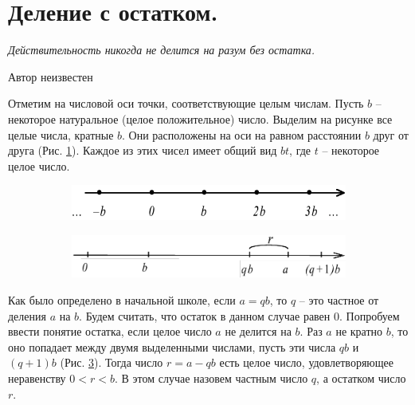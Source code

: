 
\section{Деление с остатком.}

\epigraph{
\textit{Действительность никогда не делится на разум без остатка.
}}{Автор неизвестен}

Отметим на числовой оси точки, соответствующие целым числам. Пусть $b$ – некоторое натуральное (целое положительное) число. Выделим на рисунке все целые числа, кратные $b$. Они расположены на оси на равном расстоянии $b$ друг от друга (Рис. \ref{axis1}). Каждое из этих чисел имеет общий вид $bt$, где $t$ – некоторое целое число. 

\begin{figure}[h]
\begin{subfigure}{.5\textwidth}
  \centering
\includegraphics[width=.8\linewidth]{./img/axis1}
  \caption{}
  \label{axis1}
\end{subfigure}%
\begin{subfigure}{.5\textwidth}
  \centering
\includegraphics[width=.8\linewidth]{./img/axis2}
  \caption{}
  \label{axis2}
\end{subfigure}
  \caption{}
\end{figure}

Как было определено в начальной школе, если $a = qb$, то $q$ – это частное от деления $a$ на $b$. Будем считать, что остаток в данном случае равен $0$. Попробуем ввести понятие остатка, если целое число $a$ не делится на $b$. Раз $a$ не кратно $b$, то оно попадает между двумя выделенными числами, пусть эти числа $qb$ и $(q+1)b$ (Рис. \ref{axis2}). Тогда число $r = a - qb$ есть целое число, удовлетворяющее неравенству $0 < r < b$. В этом случае назовем частным число $q$, а остатком число $r$. 

